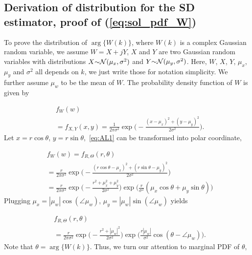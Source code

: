 \begin{appendices}

\section{Derivation of distribution for the SD estimator, proof of (\ref{eq:sol_pdf_W})}
\label{AL}

To prove the distribution of $\arg\{W(k)\}$, where $W(k)$ is a complex Gaussian 
random variable, we assume $W=X+jY$, $X$ and $Y$ are two Gaussian random 
variables with distributions $X {\sim} \mathcal{N}(\mu_x,\sigma^2)$ 
and $Y {\sim} \mathcal{N}(\mu_y,\sigma^2)$. Here, $W$, $X$, $Y$, $\mu_x$, $\mu_y$ 
and $\sigma^2$ all depends on $k$, we just write those for notation simplicity. 
We further assume $\mu_w$ to be the mean of $W$. The probability density function 
of $W$ is given by

\begin{equation}
    \label{eq:AL1}
    \begin{aligned}
    &f_W(w) \\
    &{=}f_{X,Y}(x,y){=}\frac{1}{2\pi \sigma^2}\exp\bigg({-}\frac{(x-\mu_x)^2+(y-\mu_y)^2}{2\sigma^2}\bigg).
    \end{aligned}
\end{equation}
Let $x=r\cos\theta$, $y=r\sin\theta$,~\eqref{eq:AL1} can be transformed into polar coordinate,

\begin{equation}
    \label{eq:AL2}
    \begin{aligned}
    &f_W(w){=} f_{R,\Theta}(r,\theta) \\
    &{=}\frac{r}{2\pi \sigma^2}\exp\bigg({-}\frac{(r\cos\theta-\mu_x)^2+(r\sin\theta-\mu_y)^2}{2\sigma^2}\bigg) \\
    &{=}\frac{r}{2\pi \sigma^2}\exp\bigg({-}\frac{r^2{+}\mu_x^2{+}\mu_y^2}{2\sigma^2}\bigg)\exp\bigg(\frac{r}{\sigma^2}(\mu_x\cos\theta{+}\mu_y\sin\theta)\bigg)
    \end{aligned}
\end{equation}
Plugging $\mu_x=|\mu_w|\cos(\angle\mu_w)$, $\mu_y=|\mu_w|\sin(\angle\mu_w)$ yields

\begin{equation}
    \label{eq:AL3}
    \begin{aligned}
    &f_{R,\Theta}(r,\theta) \\
    &{=}\frac{r}{2\pi \sigma^2}\exp\bigg({-}\frac{r^2+|\mu_w|^2}{2\sigma^2}\bigg)\exp\bigg(\frac{r|\mu_w|}{\sigma^2}\cos(\theta{-}\angle\mu_w)\bigg).
    \end{aligned}
\end{equation}
Note that $\theta=\arg\{W(k)\}$. Thus, we turn our attention to mar\-ginal PDF of $\theta$, 


\end{appendices}
